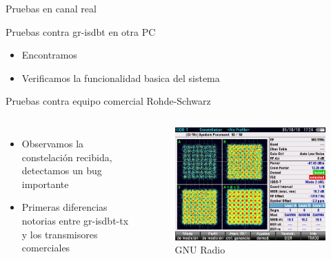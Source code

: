 
\begin{frame}{Pruebas en canal real}
\begin{block}{Pruebas contra gr-isdbt en otra PC}
	\begin{itemize}	
		\item { Encontramos  }
		\item { Verificamos la funcionalidad basica del sistema }
	\end{itemize}
\end{block}

\begin{block}{Pruebas contra equipo comercial Rohde-Schwarz}
\begin{columns}
	\begin{itemize}	
		\item {	Observamos la constelación recibida, detectamos un bug importante }
		\item { Primeras diferencias notorias entre gr-isdbt-tx y los transmisores comerciales }
	\end{itemize}
	\begin{figure}
		\includegraphics[scale=0.25]{constelacion_eth}
		\caption{GNU Radio}
	\end{figure}
\end{columns}
\end{block}
\end{frame}

